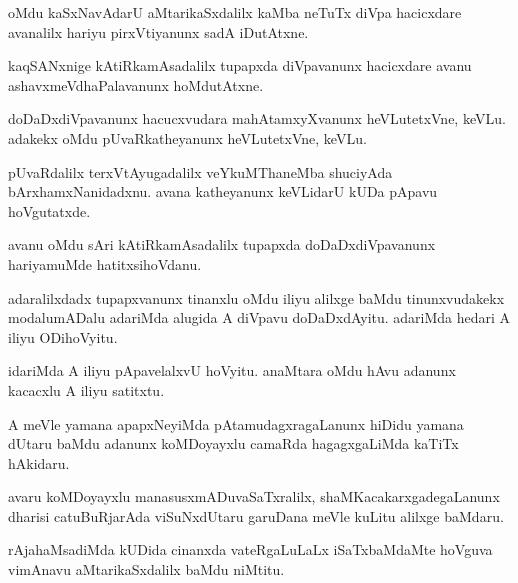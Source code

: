 \begin{mng}
oMdu kaSxNavAdarU aMtarikaSxdalilx kaMba neTuTx diVpa hacicxdare avanalilx hariyu pirxVtiyanunx sadA iDutAtxne.
\end{mng}

\begin{mng}
kaqSANxnige kAtiRkamAsadalilx tupapxda diVpavanunx hacicxdare avanu ashavxmeVdhaPalavanunx hoMdutAtxne.
\end{mng}

\begin{mng}
doDaDxdiVpavanunx hacucxvudara mahAtamxyXvanunx heVLutetxVne, keVLu. adakekx oMdu pUvaRkatheyanunx heVLutetxVne, keVLu.
\end{mng}

\begin{mng}
pUvaRdalilx terxVtAyugadalilx veYkuMThaneMba shuciyAda bArxhamxNanidadxnu. avana katheyanunx keVLidarU kUDa pApavu hoVgutatxde.
\end{mng}

\begin{mng}
avanu oMdu sAri kAtiRkamAsadalilx tupapxda doDaDxdiVpavanunx hariyamuMde hatitxsihoVdanu.
\end{mng}

\begin{mng}
adaralilxdadx tupapxvanunx tinanxlu oMdu iliyu alilxge baMdu tinunxvudakekx modalumADalu adariMda alugida A diVpavu doDaDxdAyitu. adariMda hedari A iliyu ODihoVyitu. 
\end{mng}

\begin{mng}
idariMda A iliyu pApavelalxvU hoVyitu. anaMtara oMdu hAvu adanunx kacacxlu A iliyu satitxtu.
\end{mng}

\begin{mng}
A meVle yamana apapxNeyiMda pAtamudagxragaLanunx hiDidu yamana dUtaru baMdu adanunx koMDoyayxlu camaRda hagagxgaLiMda kaTiTx hAkidaru.
\end{mng}

\begin{mng}
avaru koMDoyayxlu manasusxmADuvaSaTxralilx, shaMKacakarxgadegaLanunx dharisi catuBuRjarAda viSuNxdUtaru garuDana meVle kuLitu alilxge baMdaru.
\end{mng}

\begin{mng}
rAja{ha}MsadiMda kUDida cinanxda vateRgaLuLaLx iSaTxbaMdaMte hoVguva vimAnavu aMtarikaSxdalilx baMdu niMtitu.
\end{mng}

